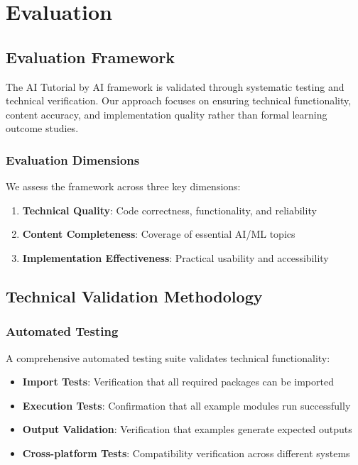 \section{Evaluation}
\label{sec:evaluation}

\subsection{Evaluation Framework}

The AI Tutorial by AI framework is validated through systematic testing and technical verification. Our approach focuses on ensuring technical functionality, content accuracy, and implementation quality rather than formal learning outcome studies.

\subsubsection{Evaluation Dimensions}

We assess the framework across three key dimensions:

\begin{enumerate}
    \item \textbf{Technical Quality}: Code correctness, functionality, and reliability
    \item \textbf{Content Completeness}: Coverage of essential AI/ML topics
    \item \textbf{Implementation Effectiveness}: Practical usability and accessibility
\end{enumerate}

\subsection{Technical Validation Methodology}

\subsubsection{Automated Testing}

A comprehensive automated testing suite validates technical functionality:

\begin{itemize}
    \item \textbf{Import Tests}: Verification that all required packages can be imported
    \item \textbf{Execution Tests}: Confirmation that all example modules run successfully
    \item \textbf{Output Validation}: Verification that examples generate expected outputs
    \item \textbf{Cross-platform Tests}: Compatibility verification across different systems
\end{itemize}

